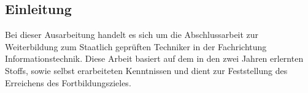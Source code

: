 \subsection{Einleitung}\label{vw_einleitung}
Bei dieser Ausarbeitung handelt es sich um die Abschlussarbeit zur Weiterbildung zum Staatlich geprüften Techniker in der Fachrichtung Informationstechnik.
Diese Arbeit basiert auf dem in den zwei Jahren erlernten Stoffs, sowie selbst erarbeiteten Kenntnissen und dient zur Feststellung des Erreichens des Fortbildungszieles.